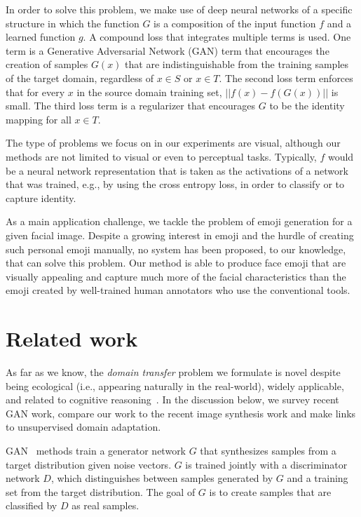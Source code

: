 \documentclass{article} \usepackage{iclr2017_conference,times}
\begin{document}
In order to solve this problem, we make use of deep neural networks of a specific structure in which the function $G$ is a composition of the input function $f$ and a learned function $g$. A compound loss that integrates multiple terms is used. One term is a Generative Adversarial Network (GAN) term that encourages the creation of samples $G(x)$ that are indistinguishable from the training samples of the target domain, regardless of $x\in S$ or $x\in T$. The second loss term enforces that for every $x$ in the source domain training set, $||f(x) - f(G(x))||$ is small. The third loss term is a regularizer that encourages $G$ to be the identity mapping for all $x \in T$.

The type of problems we focus on in our experiments are visual, although our methods are not limited to visual or even to perceptual tasks. Typically, $f$ would be a neural network representation that is taken as the activations of a network that was trained, e.g., by using the cross entropy loss, in order to classify or to capture identity.

As a main application challenge, we tackle the problem of emoji generation for a given facial image. Despite a growing interest in emoji and the hurdle of creating such personal emoji manually, no system has been proposed, to our knowledge, that can solve this problem. Our method is able to produce face emoji that are visually appealing and capture much more of the facial characteristics than the emoji created by well-trained human annotators who use the conventional tools.

\section{Related work}
\label{sec:relatedwork}
As far as we know, the {\it domain transfer} problem we formulate is novel despite being ecological (i.e., appearing naturally in the real-world), widely applicable, and related to cognitive reasoning~\citep{thewaywethink}. In the discussion below, we survey recent GAN work, compare our work to the recent image synthesis work and make links to unsupervised domain adaptation.

GAN~\citep{gan} methods train a generator network $G$ that synthesizes samples from a 
target distribution given noise vectors. $G$ is trained jointly with a discriminator network $D$, which distinguishes between samples generated by $G$ and a training set from the target distribution. The goal of $G$ is to create samples that are classified by $D$ as real samples.
\end{document}
